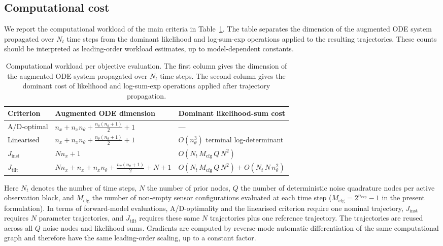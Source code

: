 \documentclass[a4paper,11pt]{article}
\begin{document}
\subsection{Computational cost}
\label{sec:cost}

We report the computational workload of the main criteria in
Table~\ref{tab:complexity}. The table separates the dimension of the
augmented ODE system propagated over \(N_t\) time steps from the dominant
likelihood and log-sum-exp operations applied to the resulting trajectories.
These counts should be interpreted as leading-order workload estimates, up to
model-dependent constants.

\begin{table}[htbp]
\centering
\caption{Computational workload per objective evaluation. The first column
gives the dimension of the augmented ODE system propagated over \(N_t\) time
steps. The second column gives the dominant cost of likelihood and
log-sum-exp operations applied after trajectory propagation.}
\label{tab:complexity}
\small
\begin{tabular}{l l l}
\toprule
Criterion & Augmented ODE dimension & Dominant likelihood-sum cost \\
\midrule
A/D-optimal
  & \(n_x + n_x n_\theta + \frac{n_\theta(n_\theta+1)}{2} + 1\)
  & --- \\[0.8ex]
Linearised
  & \(n_x + n_x n_\theta + \frac{n_\theta(n_\theta+1)}{2} + 1\)
  & \(O(n_\theta^3)\) terminal log-determinant \\[0.8ex]
\(J_{\mathrm{inst}}\)
  & \(N n_x + 1\)
  & \(O(N_t\,M_{\mathrm{cfg}}\,Q\,N^2)\) \\[0.8ex]
\(J_{\mathrm{tilt}}\)
  & \(N n_x + n_x + n_x n_\theta
     + \frac{n_\theta(n_\theta+1)}{2} + N + 1\)
  & \(O(N_t\,M_{\mathrm{cfg}}\,Q\,N^2)
     + O(N_t\,N\,n_\theta^2)\) \\
\bottomrule
\end{tabular}
\end{table}

Here \(N_t\) denotes the number of time steps, \(N\) the number of prior
nodes, \(Q\) the number of deterministic noise quadrature nodes per active
observation block, and \(M_{\mathrm{cfg}}\) the number of non-empty sensor
configurations evaluated at each time step
(\(M_{\mathrm{cfg}}=2^{n_{\exp}}-1\) in the present formulation).
In terms of forward-model evaluations, A/D-optimality and the linearised
criterion require one nominal trajectory, \(J_{\mathrm{inst}}\) requires
\(N\) parameter trajectories, and \(J_{\mathrm{tilt}}\) requires these same
\(N\) trajectories plus one reference trajectory. The trajectories are reused
across all \(Q\) noise nodes and likelihood sums. Gradients are computed by
reverse-mode automatic differentiation of the same computational graph and
therefore have the same leading-order scaling, up to a constant factor.
\end{document}
